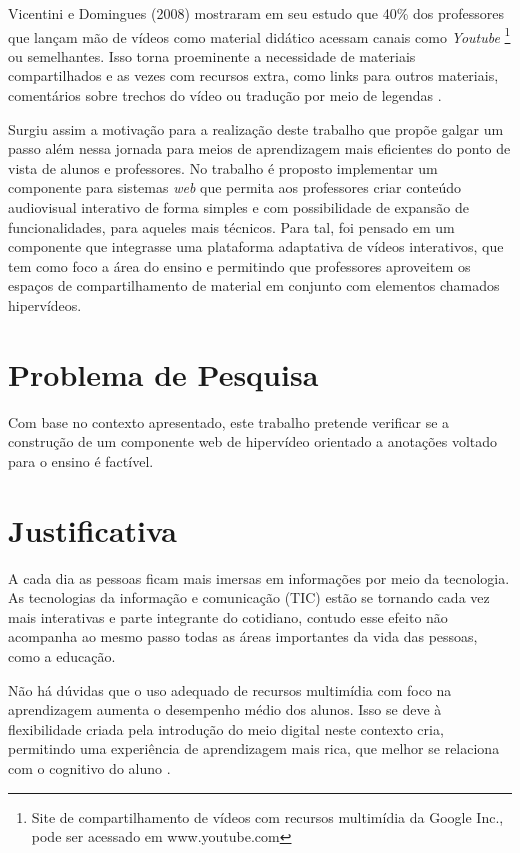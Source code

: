 Vicentini e Domingues (2008) mostraram em seu estudo que 40\% dos professores que lançam mão de vídeos como material didático acessam canais como \textit{Youtube} \footnote{Site de compartilhamento de vídeos com recursos multimídia da Google Inc., pode ser acessado em www.youtube.com} ou semelhantes. Isso torna proeminente a necessidade de materiais compartilhados e as vezes com recursos extra, como links para outros materiais, comentários sobre trechos do vídeo ou tradução por meio de legendas \cite{vicentini2008uso}.

Surgiu assim a motivação para a realização deste trabalho que propõe galgar um passo além nessa jornada para meios de aprendizagem mais eficientes do ponto de vista de alunos e professores. No trabalho é proposto implementar um componente para sistemas \textit{web} que permita aos professores criar conteúdo audiovisual interativo de forma simples e com possibilidade de expansão de funcionalidades, para aqueles mais técnicos. Para tal, foi pensado em um componente que integrasse uma plataforma adaptativa de vídeos interativos, que tem como foco a área do ensino e permitindo que professores aproveitem os espaços de compartilhamento de material em conjunto com elementos chamados hipervídeos.

\section{Problema de Pesquisa}

Com base no contexto apresentado, este trabalho pretende verificar se a construção de um componente web de hipervídeo orientado a anotações voltado para o ensino é factível.

\section{Justificativa}

A cada dia as pessoas ficam mais imersas em informações por meio da tecnologia. As tecnologias da informação e comunicação (TIC) estão se tornando cada vez mais interativas e parte integrante do cotidiano, contudo esse efeito não acompanha ao mesmo passo todas as áreas importantes da vida das pessoas, como a educação.

Não há dúvidas que o uso adequado de recursos multimídia com foco na aprendizagem aumenta o desempenho médio dos alunos. Isso se deve à flexibilidade criada pela introdução do meio digital neste contexto cria, permitindo uma experiência de aprendizagem mais rica, que melhor se relaciona com o cognitivo do aluno \cite{moreno2000, zhang2005}.

